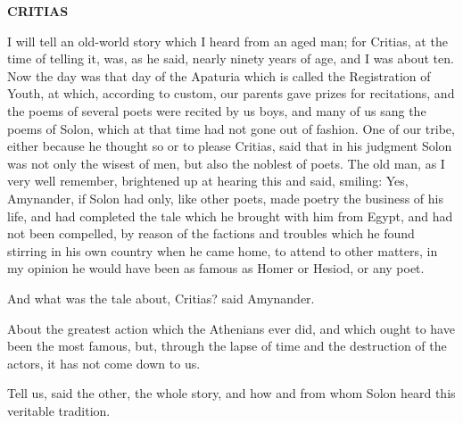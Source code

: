 \documentclass[11pt,letter]{article}
\begin{document}
\par \textbf{CRITIAS}
\par   I will tell an old-world story which I heard from an aged man; for Critias, at the time of telling it, was, as he said, nearly ninety years of age, and I was about ten. Now the day was that day of the Apaturia which is called the Registration of Youth, at which, according to custom, our parents gave prizes for recitations, and the poems of several poets were recited by us boys, and many of us sang the poems of Solon, which at that time had not gone out of fashion. One of our tribe, either because he thought so or to please Critias, said that in his judgment Solon was not only the wisest of men, but also the noblest of poets. The old man, as I very well remember, brightened up at hearing this and said, smiling:  Yes, Amynander, if Solon had only, like other poets, made poetry the business of his life, and had completed the tale which he brought with him from Egypt, and had not been compelled, by reason of the factions and troubles which he found stirring in his own country when he came home, to attend to other matters, in my opinion he would have been as famous as Homer or Hesiod, or any poet.

\par  And what was the tale about, Critias? said Amynander.

\par  About the greatest action which the Athenians ever did, and which ought to have been the most famous, but, through the lapse of time and the destruction of the actors, it has not come down to us.

\par  Tell us, said the other, the whole story, and how and from whom Solon heard this veritable tradition.
\end{document}
